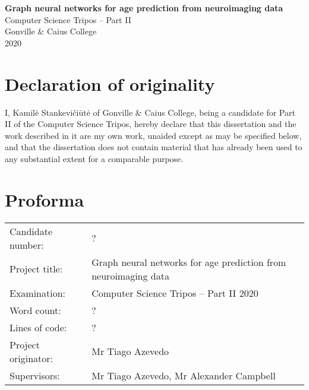 \pagestyle{empty}
\thispagestyle{empty}


\vspace*{60mm}
\begin{center}
\LARGE
\textbf{Graph neural networks for age prediction from neuroimaging data} \\[5mm]
\large
Computer Science Tripos -- Part II \\[5mm]
Gonville \& Caius College \\[5mm]
2020
\end{center}


\pagestyle{plain}
\newpage
\chapter*{Declaration of originality}

I, Kamilė Stankevičiūtė of Gonville \& Caius College, being a candidate for Part II of the Computer Science Tripos, hereby declare that this dissertation and the work described in it are my own work, unaided except as may be specified below, and that the dissertation does not contain material that has already been used to any substantial extent for a comparable purpose.

\bigskip
{}

\medskip
{}

\chapter*{Proforma}

\begin{tabular}{ll}
Candidate number:   & ?                  \\
Project title:      & Graph neural networks for age prediction from neuroimaging data \\
Examination:        & Computer Science Tripos -- Part II 2020 \\
Word count:         & ? \footnotemark[1] \\
Lines of code:      & ?  \\
Project originator: & Mr Tiago Azevedo                        \\
Supervisors:        & Mr Tiago Azevedo, Mr Alexander Campbell \\ 
\end{tabular}

